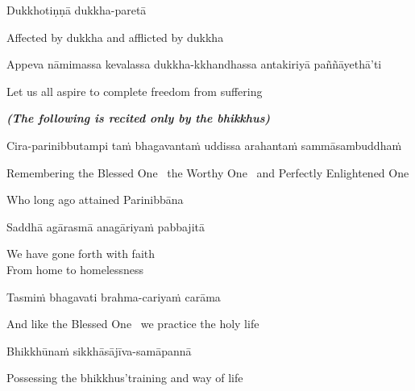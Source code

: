 Dukkhotiṇṇā dukkha-paretā

\begin{english}
  Affected by dukkha and afflicted by dukkha\hyperlink{endnote27-appendix}{\hypertarget{endnote27-body}{}}
\end{english}

\begin{pali-hang}
  Appeva nāmimassa kevalassa dukkha-kkhandhassa antakiriyā paññāyethā'ti
\end{pali-hang}

\begin{english}
  Let us all aspire to complete freedom from suffering
\end{english}

\clearpage

\begin{center}
  \textit{\textbf{(The following is recited only by the bhikkhus)}}
\end{center}

\begin{pali-hang}
  Cira-parinibbutampi taṁ bhagavantaṁ uddissa arahantaṁ sammāsambuddhaṁ
\end{pali-hang}

\begin{english-hang}
  Remembering the Blessed One \breathmark\ the Worthy One \breathmark\ and Perfectly Enlightened One\\
\end{english-hang}

\begin{english}
  Who long ago attained Parinibbāna
\end{english}

Saddhā agārasmā anagāriyaṁ pabbajitā

\begin{english}
  We have gone forth with faith\\
  From home to homelessness
\end{english}

Tasmiṁ bhagavati brahma-cariyaṁ carāma

\begin{english}
  And like the Blessed One \breathmark\ we practice the holy life
\end{english}

Bhikkhūnaṁ sikkhāsājīva-samāpannā

\begin{english}
  Possessing the bhikkhus'training and way of life\hyperlink{endnote28-appendix}{\hypertarget{endnote28-body}{}}
\end{english}

